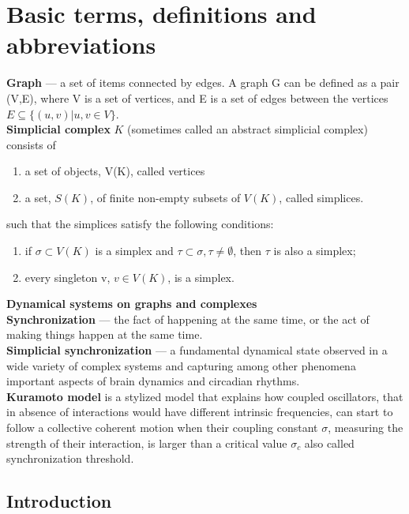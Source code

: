 \documentclass[draft]{article}
\begin{document}
\section {Basic terms, definitions and abbreviations}
\textbf{Graph} — a set of items connected by edges. A graph G can be defined as a pair (V,E), where V is a set of vertices, and E is a set of edges between the vertices  $E \subseteq \{(u,v) | u, v \in V\}$\cite{litlink1}.\\
\textbf{Simplicial complex} $K$ (sometimes called an abstract simplicial complex) consists of
\begin{enumerate} 
\item a set of objects, V(K), called vertices
\item a set, $S(K)$, of finite non-empty subsets of $V(K)$, called simplices.
\end{enumerate}
such that the simplices satisfy the following conditions:
\begin{enumerate} 
\item if $\sigma\subset V(K)$ is a simplex and $\tau\subset\sigma, \tau\neq\emptyset$, then $\tau$ is also a simplex;
\item every singleton {v}, $v\in V(K)$, is a simplex\cite{litlink4}.
\end{enumerate}
\textbf{Dynamical systems on graphs and complexes}\\
\textbf{Synchronization} — the fact of happening at the same time, or the act of making things happen at the same time\cite{litlink2}.\\
\textbf{Simplicial synchronization} — a fundamental dynamical state observed in a wide variety of complex systems and capturing among other phenomena important aspects of brain dynamics and circadian rhythms\cite{litlink3}.\\
\textbf{Kuramoto model} is a stylized model that explains how coupled oscillators, that in absence of interactions would have different intrinsic frequencies, can start to follow a collective coherent motion when their coupling constant $\sigma$, measuring the strength of their interaction, is larger than a critical value $\sigma_c$ also called synchronization threshold\cite{litlink3}.\\
\newpage
\begin{center}
\item\section {Introduction}
\end{center}
\end{document}
